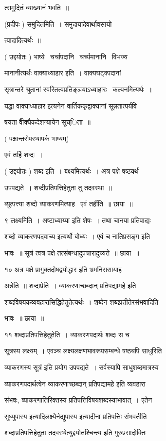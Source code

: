 \documentclass[11pt, openany]{book}
\begin{document}
त्समुदितं व्याख्यानं भवति~॥ 

(प्रदीपः ) समुदितमिति~। समुदायादेवार्थावसायो \textendash\ 

त्पादादित्यर्थः~॥ \textendash\ 

( उद्दयोतः ) भाष्ये \textendash\ चर्चापदानि \textendash\ चर्च्यमानानि \textendash\ विभज्य \textendash\ 

 मानानीत्यर्थः वाक्याध्याहार इति~। वाक्यघट्क्पदानां 

सृत्रान्तरे श्रुतानां स्वरितत्वप्रतिङ्ञयाऽध्याहारः \textendash\ कल्पनमित्यर्थः~। 

यद्धा वाक्याध्याहार इत्यनेन वार्तिककृद्वाक्यानां सून्नतात्पर्यवि \textendash\ 

षयता वैीक्यैकदेशन्यायेन सूच्िता~॥ 

( पक्षान्तरोपस्थापर्क भाष्यम्) 

एवं तर्हि शब्दः~। 

( उद्दयोतः ) शब्द इति~। बक्ष्यमित्यर्थः~। अत्र पक्षे षष्ठयर्थ 

उपपद्यते~। शब्दीप्रतिपत्तिहेतुता तु तदवस्था~॥ 

ब्युत्पत्त्या शब्दो व्याकरणमित्याह \textendash\ एवं तर्हीति~॥ छाया~॥ 

९ लक्ष्यमिति~। अष्टाध्याय्या इति शेषः~। तथा चानया प्रतिपाद्यः 

शब्दो व्याकरणपदवाच्य इत्यर्थो बोध्यः~। एवं च नातिप्रसङ्ग इति 

भावः~॥ सूत्रं त्वत्र पक्षे तत्संबन्धादुपचारादुच्यते~॥ छाया~॥ 

१० अत्र पक्षे प्रागुक्तदोषद्वयोद्धार इति भ्रमनिरासायाह \textendash\ 

अन्नेति~॥ शब्दाप्रेति~। {\qt व्याकरणाच्छब्दान् प्रतिपद्यामहे} इति 

शब्दविषयकव्यवहारासिद्धिहेतुतेत्यर्थः~। शब्देन शब्दप्रतीतेरसंभवादिति 

भावः~॥ छाया~॥ 

११ शब्दाप्रतिपत्तिहेतुतेति~। व्याकरणपदार्थः शब्दः स च 

सूत्रस्य लक्ष्यम्~। एवञ्च लक्ष्यलक्षणभावरूपसम्बन्धे षष्ठ्यपि साधुरिति 

{\qt व्याकरणस्य सूत्रं} इति प्रयोग उपपद्यते~। सर्वस्यापि साधुशब्दमात्रस्य 

व्याकरणपदार्थत्वेन {\qt व्याकरणाच्छब्दान् प्रतिपद्यामहे} इति व्यवहारा \textendash\ 

संभवः, व्याकरणातिरिक्तस्य प्रतिपत्तिविषयशब्दस्याभावात्~। एतेन 

सुध्युपास्य इत्यादिलक्ष्यैर्नद्युपास्य इत्यादीनां प्रतिपत्तिः संभवतीति


{\qt शब्दाप्रतिपत्तिहेतुता तदवस्थेत्युद्दयोतश्चिन्त्य} इति गुरुप्रसादोक्तिः
\end{document}
